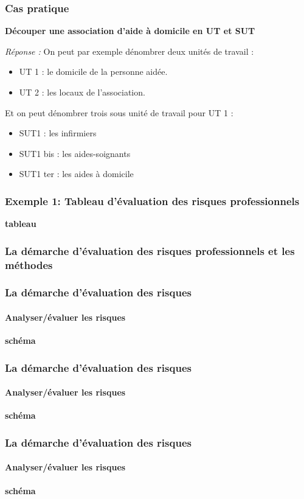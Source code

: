 \documentclass{beamer}
\begin{document}
\begin{frame}
\frametitle{Cas pratique}

\textbf{Découper une association d’aide à domicile en UT et SUT}

\textit{Réponse : }
On peut par exemple dénombrer deux unités de travail :
\begin{itemize}
\item UT 1 : le domicile de la personne aidée.
\item UT 2 : les locaux de l’association.
\end{itemize}
Et on peut dénombrer trois sous unité de travail pour UT 1 :
\begin{itemize}
\item SUT1 : les infirmiers
\item SUT1 bis : les aides-soignants
\item SUT1 ter : les aides à domicile
\end{itemize}
\end{frame}


\begin{frame}
\frametitle{Exemple 1: Tableau d’évaluation des risques professionnels}

\textbf{tableau}
\end{frame}

\begin{frame}
\frametitle{La démarche d’évaluation des risques professionnels et les méthodes}

\end{frame}


\begin{frame}
\frametitle{La démarche d’évaluation des risques}
\framesubtitle{Analyser/évaluer les risques}
\textbf{schéma}
\end{frame}

\begin{frame}
\frametitle{La démarche d’évaluation des risques}
\framesubtitle{Analyser/évaluer les risques}
\textbf{schéma}
\end{frame}

\begin{frame}
\frametitle{La démarche d’évaluation des risques}
\framesubtitle{Analyser/évaluer les risques}
\textbf{schéma}
\end{frame}
\end{document}
